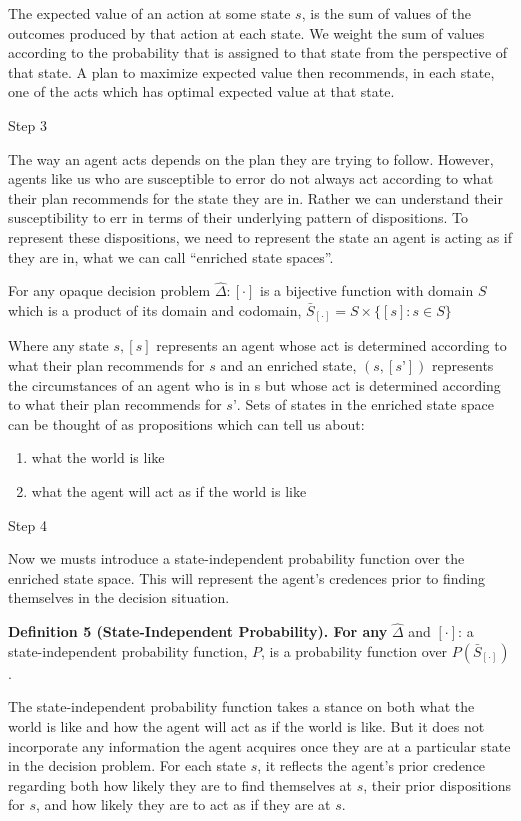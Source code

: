 \documentclass[
  letterpaper,
  DIV=11,
  numbers=noendperiod]{scrartcl}
\providecommand{\tightlist}{%
  \setlength{\itemsep}{0pt}\setlength{\parskip}{0pt}}
\begin{document}
The expected value of an action at some state \(s\), is the sum of
values of the outcomes produced by that action at each state. We weight
the sum of values according to the probability that is assigned to that
state from the perspective of that state. A plan to maximize expected
value then recommends, in each state, one of the acts which has optimal
expected value at that state.

Step 3

The way an agent acts depends on the plan they are trying to follow.
However, agents like us who are susceptible to error do not always act
according to what their plan recommends for the state they are in.
Rather we can understand their susceptibility to err in terms of their
underlying pattern of dispositions. To represent these dispositions, we
need to represent the state an agent is acting as if they are in, what
we can call ``enriched state spaces''.

For any opaque decision problem \(\hat{\Delta}: [\cdot]\) is a bijective
function with domain \(S\) which is a product of its domain and
codomain, \(\bar{S}_{[\cdot]} = S \times \{[s] : s \in S\}\)

Where any state \(s, [s]\) represents an agent whose act is determined
according to what their plan recommends for \(s\) and an enriched state,
\((s, [s’])\) represents the circumstances of an agent who is in s but
whose act is determined according to what their plan recommends for
\(s’\). Sets of states in the enriched state space can be thought of as
propositions which can tell us about:

\begin{enumerate}
\def\labelenumi{\arabic{enumi}.}
\tightlist
\item
  what the world is like
\item
  what the agent will act as if the world is like
\end{enumerate}

Step 4

Now we musts introduce a state-independent probability function over the
enriched state space. This will represent the agent's credences prior to
finding themselves in the decision situation.

\textbf{Definition 5 (State-Independent Probability). For any}
\(\hat{\Delta}\) and \([\cdot]\): a state-independent probability
function, \(P\), is a probability function over
\(P(\bar{S}_{[\cdot]})\).

The state-independent probability function takes a stance on both what
the world is like and how the agent will act as if the world is like.
But it does not incorporate any information the agent acquires once they
are at a particular state in the decision problem. For each state \(s\),
it reflects the agent's prior credence regarding both how likely they
are to find themselves at \(s\), their prior dispositions for \(s\), and
how likely they are to act as if they are at \(s\).
\end{document}
